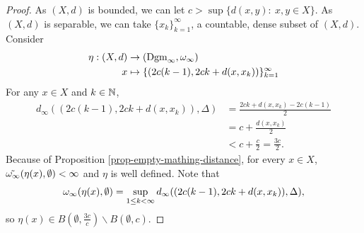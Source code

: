 \begin{proof}
    As $ (X, d) $ is bounded, we can let $ c > \sup \{d(x, y): \  x, y \in X\} $. As $ (X, d) $ is separable, we can take $ \{x_k\}_{k=1}^\infty $, a countable, dense subset of $ (X, d) $. Consider
    \begin{align*}
        \eta: (X, d) &\to (\operatorname{Dgm}_\infty, \omega_\infty) \\
        x &\mapsto \{(2c(k-1), 2ck + d(x, x_k))\}_{k=1}^\infty
    \end{align*}
    For any $ x \in X $ and $ k \in \mathbb N$,
    \begin{align*}
        d_\infty((2c(k-1), 2ck + d(x, x_k)), \Delta) 
        &= \frac{2ck + d(x, x_k) - 2c(k-1)}{2} \\
        &= c + \frac{d(x, x_k)}{2} \\
        &< c + \frac{c}{2} = \frac{3c}{2}.
    \end{align*}
    Because of Proposition \ref{prop-empty-mathing-distance}, for every $ x \in X $, $ \tilde {\omega_\infty}(\eta(x), \emptyset) < \infty $ and $ \eta $ is well defined. Note that
    \begin{align*}
        \omega_\infty(\eta(x), \emptyset) = \sup_{1 \leq k < \infty} d_\infty((2c(k-1), 2ck + d(x, x_k)), \Delta),
    \end{align*}
    so $ \eta(x) \in B(\emptyset, \frac{3c}{c}) \backslash B(\emptyset, c)$.


\end{proof}
